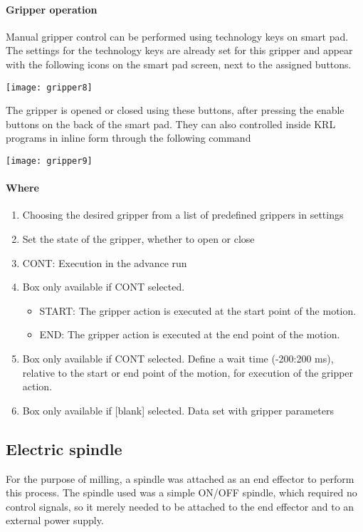  		\paragraph{Gripper operation}
 		Manual gripper control can be performed using technology keys on smart pad. The settings for the technology keys are already set for this gripper and appear with the following icons on the smart pad screen, next to the assigned buttons. 
 		
 	\begin{center}
 		\texttt{[image: gripper8]} 
 	\end{center}
 
 The gripper is opened or closed using these buttons, after pressing the enable buttons on the back of the smart pad. They can also controlled inside KRL programs in inline form through the following command
 \begin{center}
 	\texttt{[image: gripper9]}
 \end{center}
 
 	\paragraph{Where}
 	\begin{enumerate}
 		\item Choosing the desired gripper from a list of predefined grippers in settings
 		\item Set the state of the gripper, whether to open or close
 		\item CONT: Execution in the advance run
 		\item Box only available if CONT selected.
 			\begin{itemize}
 				\item START: The gripper action is executed at the start point of the motion.
 				\item END: The gripper action is executed at the end point of the motion.
 			\end{itemize}
 		\item Box only available if CONT selected.
 			Define a wait time (-200:200 ms), relative to the start or end point of the motion, for execution of the gripper action.
 		\item Box only available if [blank] selected.
 		Data set with gripper parameters
 	\end{enumerate}
 
 \subsection{Electric spindle}
 For the purpose of milling, a spindle was attached as an end effector to perform this process. The spindle used was a simple ON/OFF spindle, which required no control signals, so it merely needed to be attached to the end effector and to an external power supply. 
 
